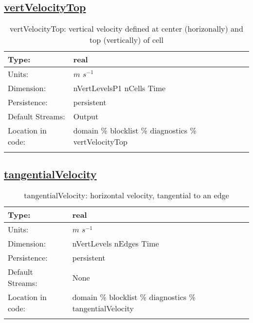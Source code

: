 \subsection[vertVelocityTop]{\hyperref[sec:var_tab_diagnostics]{vertVelocityTop}}
\label{subsec:var_sec_diagnostics_vertVelocityTop}
\begin{center}
\begin{longtable}{| p{2.0in} | p{4.0in} |}
        \hline 
        Type: & real \\
        \hline 
        Units: & $m$ $s^{-1}$ \\
        \hline 
        Dimension: & nVertLevelsP1 nCells Time \\
        \hline 
        Persistence: & persistent \\
        \hline 
		 Default Streams: & Output  \\
        \hline 
		 Location in code: & domain \% blocklist \% diagnostics \% vertVelocityTop \\
		 \hline 
    \caption{vertVelocityTop: vertical velocity defined at center (horizonally) and top (vertically) of cell}
\end{longtable}
\end{center}
\subsection[tangentialVelocity]{\hyperref[sec:var_tab_diagnostics]{tangentialVelocity}}
\label{subsec:var_sec_diagnostics_tangentialVelocity}
\begin{center}
\begin{longtable}{| p{2.0in} | p{4.0in} |}
        \hline 
        Type: & real \\
        \hline 
        Units: & $m$ $s^{-1}$ \\
        \hline 
        Dimension: & nVertLevels nEdges Time \\
        \hline 
        Persistence: & persistent \\
        \hline 
		 Default Streams: & None \\
        \hline 
		 Location in code: & domain \% blocklist \% diagnostics \% tangentialVelocity \\
		 \hline 
    \caption{tangentialVelocity: horizontal velocity, tangential to an edge}
\end{longtable}
\end{center}
